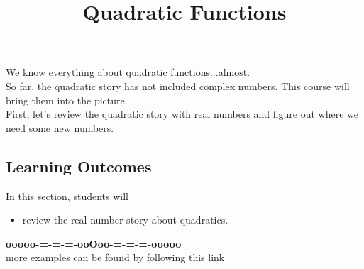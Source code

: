 \documentclass{ximera}
\title{Quadratic Functions}
\begin{document}
\begin{abstract}
\end{abstract}
\maketitle



We know everything about quadratic functions...almost. \\

So far, the quadratic story has not included complex numbers.  This course will bring them into the picture. \\



First, let's review the quadratic story with real numbers and figure out where we need some new numbers.













\subsection*{Learning Outcomes}

\begin{sectionOutcomes}
In this section, students will 

\begin{itemize}
\item review the real number story about quadratics.
\end{itemize}
\end{sectionOutcomes}










\begin{center}
\textbf{\textcolor{green!50!black}{ooooo-=-=-=-ooOoo-=-=-=-ooooo}} \\

more examples can be found by following this link\\ 

\end{center}
\end{document}
